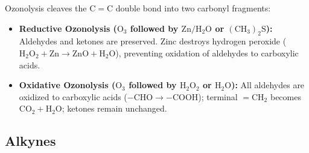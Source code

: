 \documentclass[10pt,twoside,openright]{book}
\begin{document}
\begin{ncertbox}
Ozonolysis cleaves the $\mathrm{C=C}$ double bond into two carbonyl fragments:
\begin{itemize}
  \item \textbf{Reductive Ozonolysis ($\mathrm{O_3}$ followed by $\mathrm{Zn / H_2O}$ or $\mathrm{(CH_3)_2S}$):} Aldehydes and ketones are preserved. Zinc destroys hydrogen peroxide ($\mathrm{H_2O_2} + \mathrm{Zn} \to \mathrm{ZnO} + \mathrm{H_2O}$), preventing oxidation of aldehydes to carboxylic acids.
  \item \textbf{Oxidative Ozonolysis ($\mathrm{O_3}$ followed by $\mathrm{H_2O_2}$ or $\mathrm{H_2O}$):} All aldehydes are oxidized to carboxylic acids ($-\mathrm{CHO} \to -\mathrm{COOH}$); terminal $=\mathrm{CH_2}$ becomes $\mathrm{CO_2} + \mathrm{H_2O}$; ketones remain unchanged.
\end{itemize}
\end{ncertbox}

\subsection{Alkynes}
\end{document}
